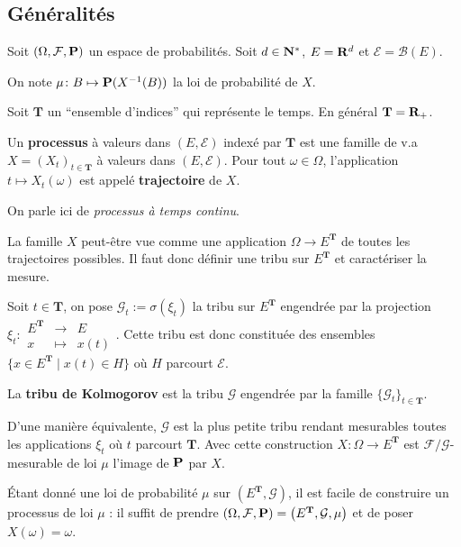 \subsection{Généralités}

	Soit $(\Omega,\mathcal{F},\mathbf{P})$ un espace de probabilités.
	Soit $d \in \mathbf{N}^*$, $E = \mathbf{R}^d$ et $\mathcal{E} = \mathcal{B}(E)$.
	
	On note $\mu \colon B \mapsto \mathbf{P}(X^{-1}(B))$ la loi de probabilité de $X$.
	
	Soit $\mathbf{T}$ un “ensemble d'indices” qui représente le temps.
	En général $\mathbf{T} = \mathbf{R}_+$.
	
	\begin{defn}
		Un \textbf{processus} à valeurs dans $(E,\mathcal{E})$ indexé par $\mathbf{T}$ est une famille de v.a $X = (X_t)_{t \in \mathbf{T}}$ à valeurs dans $(E,\mathcal{E})$.
		Pour tout $\omega \in \Omega$, l'application $t \mapsto X_t(\omega)$ est appelé \textbf{trajectoire} de $X$.
	\end{defn}
	
	On parle ici de \textit{processus à temps continu}.
	
	La famille $X$ peut-être vue comme une application $\Omega \to E^{\mathbf{T}}$ de toutes les trajectoires possibles.
	Il faut donc définir une tribu sur $E^{\mathbf{T}}$ et caractériser la mesure.
	
	Soit $t \in \mathbf{T}$, on pose $\mathcal{G}_t := \sigma(\xi_t)$ la tribu sur $E^{\mathbf{T}}$ engendrée par la projection $\xi_t \colon \begin{array}{lcr} E^{\mathbf{T}} & \to & E \\ x & \mapsto & x(t) \end{array}$.
	Cette tribu est donc constituée des ensembles $\{ x \in E^{\mathbf{T}} \mid x(t) \in H \}$ où $H$ parcourt $\mathcal{E}$.
	
	\begin{defn}
		La \textbf{tribu de Kolmogorov} est la tribu $\mathcal{G}$ engendrée par la famille $\{ \mathcal{G}_t \}_{t \in \mathbf{T}}$.
	\end{defn}
	
	D'une manière équivalente, $\mathcal{G}$ est la plus petite tribu rendant mesurables toutes les applications $\xi_t$ où $t$ parcourt $\mathbf{T}$.
	Avec cette construction $X \colon \Omega \to E^{\mathbf{T}}$ est $\mathcal{F}/\mathcal{G}$-mesurable de loi $\mu$ l'image de $\mathbf{P}$ par $X$.
	
	Étant donné une loi de probabilité $\mu$ sur $\left( E^{\mathbf{T}}, \mathcal{G} \right)$, il est facile de construire un processus de loi $\mu$ : il suffit de prendre $(\Omega, \mathcal{F}, \mathbf{P}) = \left( E^{\mathbf{T}}, \mathcal{G}, \mu \right)$ et de poser $X(\omega) = \omega$.
	
